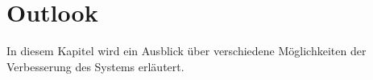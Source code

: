 \chapter{Outlook}\label{ch:outlook}

In diesem Kapitel wird ein Ausblick über verschiedene Möglichkeiten der Verbesserung des Systems erläutert.
